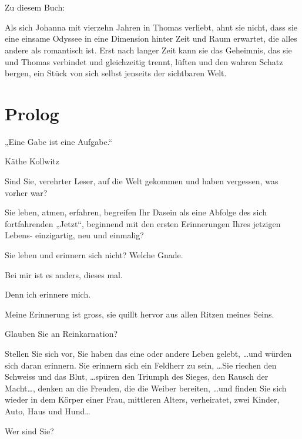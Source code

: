 \documentclass[10pt,titlepage,a5paper]{book}
\newenvironment{dichter}{\begin{flushright}}{\end{flushright}}
\begin{document}
\thispagestyle{empty}


\chapter*{}

Zu diesem Buch:

Als sich Johanna mit vierzehn Jahren in Thomas verliebt, ahnt sie nicht, dass sie eine einsame Odyssee in eine Dimension hinter Zeit und Raum erwartet, die alles andere als romantisch ist. Erst nach langer Zeit kann sie das Geheimnis, das sie und Thomas verbindet und gleichzeitig trennt, lüften und den wahren Schatz bergen, ein Stück von sich selbst jenseits der sichtbaren Welt.



\chapter*{Prolog}




„Eine Gabe ist eine Aufgabe.“
\begin{dichter} Käthe Kollwitz\end{dichter}

Sind Sie, verehrter Leser,  auf die Welt gekommen und haben vergessen, was vorher war?

Sie leben,  atmen, erfahren, begreifen Ihr Dasein als eine Abfolge des sich fortfahrenden „Jetzt“, beginnend mit den ersten Erinnerungen Ihres jetzigen Lebens- einzigartig, neu und einmalig?

Sie leben und erinnern sich nicht? Welche Gnade.

Bei mir ist es anders, dieses  mal.

Denn ich erinnere mich.

Meine Erinnerung ist gross, sie quillt hervor aus allen Ritzen meines Seins.

Glauben Sie an Reinkarnation?

Stellen Sie sich vor, Sie haben das eine oder andere Leben gelebt, \dots und würden sich daran erinnern. Sie erinnern sich ein Feldherr zu sein, \dots Sie riechen den Schweiss und das Blut, \dots spüren den Triumph des Sieges, den Rausch der Macht\dots, denken an die Freuden, die die Weiber bereiten, \dots und finden Sie sich wieder in dem Körper einer Frau, mittleren Alters, verheiratet, zwei Kinder, Auto, Haus und Hund\dots

Wer sind Sie?
\end{document}
